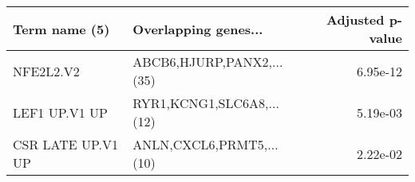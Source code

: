 \begin{tabular}{llr}
\toprule
    Term name (5) &      Overlapping genes... &  Adjusted p-value \\
\midrule
        NFE2L2.V2 & ABCB6,HJURP,PANX2,...(35) &          6.95e-12 \\
    LEF1 UP.V1 UP & RYR1,KCNG1,SLC6A8,...(12) &          5.19e-03 \\
CSR LATE UP.V1 UP &  ANLN,CXCL6,PRMT5,...(10) &          2.22e-02 \\
\bottomrule
\end{tabular}
